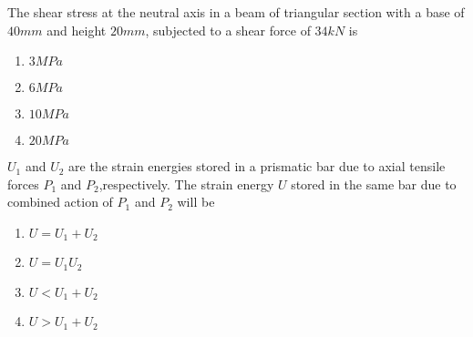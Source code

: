 \item The shear stress at the neutral axis in a beam of triangular section with a base of $40 mm$ and height $20 mm$, subjected to a shear force of $34 kN$ is
	\begin{enumerate}
                \item $3 MPa$
                \item $6 MPa$
                \item $10 MPa$
                \item $20 MPa$
        \end{enumerate}
\item $U_1$ and $U_2$ are the strain energies stored in a prismatic bar due to axial tensile forces $P_1$ and $P_2$,respectively. The strain energy $U$ stored in the same bar due to combined action of $P_1$ and $P_2$ will be 
\begin{enumerate}
                \item $U=U_1+U_2$
                \item $U=U_1U_2$ 
                \item $U<U_1+U_2$ 
                \item $U>U_1+U_2$ 
        \end{enumerate}     

 

